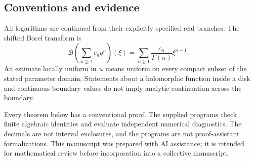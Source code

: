 \documentclass[11pt,a4paper]{article}
\theoremstyle{definition}
\theoremstyle{remark}
\numberwithin{equation}{section}
\begin{document}
\subsection{Conventions and evidence}

All logarithms are continued from their explicitly specified real
branches. The shifted Borel transform is
\[
 \mathcal B\left(\sum_{n\ge1}c_nq^n\right)(\xi)
   =\sum_{n\ge1}\frac{c_n}{\Gamma(n)}\xi^{n-1}.
\]
An estimate locally uniform in $u$ means uniform on every compact
subset of the stated parameter domain. Statements about a holomorphic
function inside a disk and continuous boundary values do not imply
analytic continuation across the boundary.

Every theorem below has a conventional proof. The supplied programs
check finite algebraic identities and evaluate independent numerical
diagnostics. The decimals are not interval enclosures, and the
programs are not proof-assistant formalizations. This manuscript was
prepared with AI assistance; it is intended for mathematical review
before incorporation into a collective manuscript.






\end{document}
